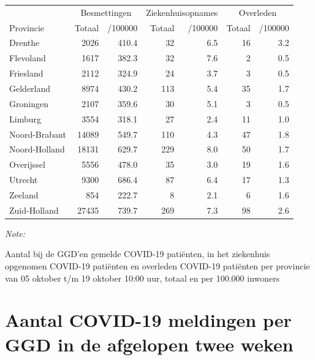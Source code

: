 \documentclass[
  english,
  man,floatsintext]{apa6}
\begin{document}
\begin{table}[H]
\centering
\begin{threeparttable}
\begin{tabular}{lrrrrrr}
\toprule
\multicolumn{1}{c}{ } & \multicolumn{2}{c}{Besmettingen} & \multicolumn{2}{c}{Ziekenhuisopnames} & \multicolumn{2}{c}{Overleden} \\
\cmidrule(l{3pt}r{3pt}){2-3} \cmidrule(l{3pt}r{3pt}){4-5} \cmidrule(l{3pt}r{3pt}){6-7}
Provincie & Totaal & /100000 & Totaal & /100000 & Totaal & /100000\\
\midrule
Drenthe & 2026 & 410.4 & 32 & 6.5 & 16 & 3.2\\
Flevoland & 1617 & 382.3 & 32 & 7.6 & 2 & 0.5\\
Friesland & 2112 & 324.9 & 24 & 3.7 & 3 & 0.5\\
Gelderland & 8974 & 430.2 & 113 & 5.4 & 35 & 1.7\\
Groningen & 2107 & 359.6 & 30 & 5.1 & 3 & 0.5\\
Limburg & 3554 & 318.1 & 27 & 2.4 & 11 & 1.0\\
Noord-Brabant & 14089 & 549.7 & 110 & 4.3 & 47 & 1.8\\
Noord-Holland & 18131 & 629.7 & 229 & 8.0 & 50 & 1.7\\
Overijssel & 5556 & 478.0 & 35 & 3.0 & 19 & 1.6\\
Utrecht & 9300 & 686.4 & 87 & 6.4 & 17 & 1.3\\
Zeeland & 854 & 222.7 & 8 & 2.1 & 6 & 1.6\\
Zuid-Holland & 27435 & 739.7 & 269 & 7.3 & 98 & 2.6\\
\bottomrule
\end{tabular}
\begin{tablenotes}
\item \textit{Note: } 
\item Aantal bij de GGD’en gemelde COVID-19 patiënten, in het ziekenhuis opgenomen COVID-19 patiënten en overleden COVID-19 patiënten per provincie van 05 oktober t/m 19 oktober 10:00 uur, totaal en per 100.000 inwoners
\end{tablenotes}
\end{threeparttable}
\end{table}

\newpage

\hypertarget{aantal-covid-19-meldingen-per-ggd-in-de-afgelopen-twee-weken}{%
\section{Aantal COVID-19 meldingen per GGD in de afgelopen twee weken}\label{aantal-covid-19-meldingen-per-ggd-in-de-afgelopen-twee-weken}}
\end{document}
